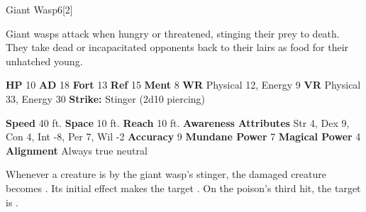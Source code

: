   \begin{monsection}{Giant Wasp}{6}[2]
    \vspace{-1em}\vspace{-1em}
    \vspace{0em}

    
      Giant wasps attack when hungry or threatened, stinging their prey to death.
      They take dead or incapacitated opponents back to their lairs as food for their unhatched young.
    
    

    \begin{spellcontent}
      \begin{spelltargetinginfo}
        \pari \textbf{HP} 10 \monsep
          \textbf{AD} 18 \monsep
          \textbf{Fort} 13 \monsep
          \textbf{Ref} 15 \monsep
          \textbf{Ment} 8
        \pari \textbf{WR} Physical 12, Energy 9 \monsep
        \textbf{VR} Physical 33, Energy 30
        \pari \textbf{Strike:}
            Stinger  (2d10 piercing)
      \end{spelltargetinginfo}
    \end{spellcontent}
    \begin{monsterfooter}
      \pari \textbf{Speed} 40 ft. \monsep
        \textbf{Space} 10 ft. \monsep
        \textbf{Reach} 10 ft.
      \pari \textbf{Awareness} 
      \pari \textbf{Attributes}
        Str 4, Dex 9,
        Con 4, Int -8,
        Per 7, Wil -2
      \pari \textbf{Accuracy} 9 \monsep
        \textbf{Mundane Power} 7 \monsep
      \textbf{Magical Power} 4
      \pari \textbf{Alignment} Always true neutral
    \end{monsterfooter}
  \end{monsection}
    Whenever a creature is  by the giant wasp's stinger,
      the damaged creature becomes .
    Its initial effect makes the target .
    On the poison's third hit, the target is .
  
